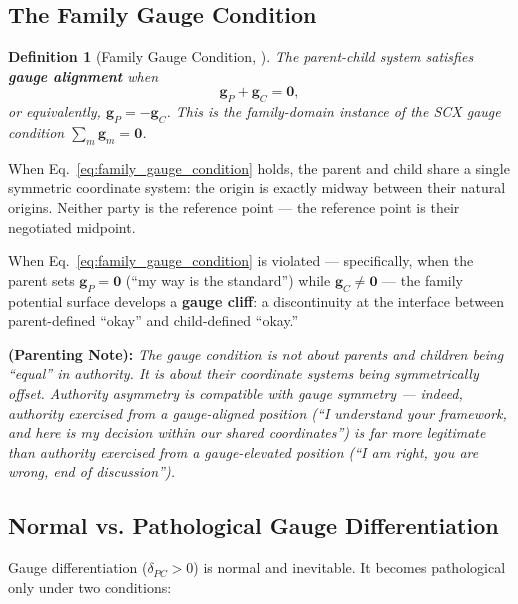 \documentclass[11pt,a4paper]{article}
\newtheorem{definition}[theorem]{Definition}
\newcommand{\sumgd}{\sum_m \mathbf{g}_m = \mathbf{0}}
\newcommand{\parentnote}[1]{%
  \medskip\noindent
  \textbf{ (Parenting Note):} \textit{#1}%
}
\begin{document}
\subsection{The Family Gauge Condition}

\begin{definition}[Family Gauge Condition, \textbf{}]
\label{def:family_gauge_condition}
The parent-child system satisfies \textbf{gauge alignment} when
\begin{equation}
    \mathbf{g}_P + \mathbf{g}_C = \mathbf{0},
    \label{eq:family_gauge_condition}
\end{equation}
or equivalently, $\mathbf{g}_P = -\mathbf{g}_C$. This is the family-domain instance of the SCX gauge condition $\sumgd$.
\end{definition}

When Eq.~\eqref{eq:family_gauge_condition} holds, the parent and child share a single symmetric coordinate system: the origin is exactly midway between their natural origins. Neither party is the reference point — the reference point is their negotiated midpoint.

When Eq.~\eqref{eq:family_gauge_condition} is violated — specifically, when the parent sets $\mathbf{g}_P = \mathbf{0}$ (``my way is the standard'') while $\mathbf{g}_C \neq \mathbf{0}$ — the family potential surface develops a \textbf{gauge cliff}: a discontinuity at the interface between parent-defined ``okay'' and child-defined ``okay.''

\parentnote{The gauge condition is not about parents and children being ``equal'' in authority. It is about their coordinate systems being symmetrically offset. Authority asymmetry is compatible with gauge symmetry — indeed, authority exercised from a gauge-aligned position (``I understand your framework, and here is my decision within our shared coordinates'') is far more legitimate than authority exercised from a gauge-elevated position (``I am right, you are wrong, end of discussion'').}

\subsection{Normal vs. Pathological Gauge Differentiation}

Gauge differentiation ($\delta_{PC} > 0$) is normal and inevitable. It becomes pathological only under two conditions:
\end{document}
